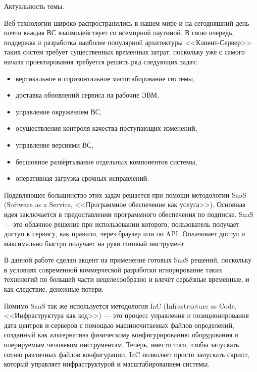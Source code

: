 \newpage

Актуальность темы.

Веб технологии широко распространились в нашем мире и на сегодняшний день почти каждая ВС взаимодействует со всемирной паутиной.
В свою очередь, поддержка и разработка наиболее популярной архитектуры <<Клиент-Сервер>> таких систем требует существенных временных затрат, поскольку уже с самого начала проектирования требуется решить ряд следующих задач:

\begin{itemize}
    \item вертикальное и горизонтальное масштабирование системы,
    \item доставка обновлений сервиса на рабочие ЭВМ,
    \item управление окружением ВС,
    \item осуществления контроля качества поступающих изменений,
    \item управление версиями ВС,
    \item бесшовное развёртывание отдельных компонентов системы,
    \item оперативная загрузка срочных исправлений.
\end{itemize}

Подавляющее большинство этих задач решается при помощи методологии SaaS (Software as a Service, <<Программное обеспечение как услуга>>).
Основная идея заключается в предоставлении программного обеспечения по подписке.
SaaS --- это облачное решение при использовании которого, пользователь получает доступ к сервису, как правило, через браузер или по API.
Оплачивает доступ и максимально быстро получает на руки готовый инструмент.

В данной работе сделан акцент на применение готовых SaaS решений, поскольку в условиях современной коммерческой разработки игнорирование таких
технологий по большей части нецелесообразно и влечёт серьёзные временные, и как следствие, денежные потери.

Помимо SaaS так же используется методология IaC (Infrastructure as Code, <<Инфраструктура как код>>) --- это процесс управления и позиционирования дата центров и серверов с помощью машиночитаемых файлов определений,
созданный как альтернатива физическому конфигурированию оборудования и оперируемым человеком инструментам.
Теперь, вместо того, чтобы запускать сотню различных файлов конфигурации,
IaC позволяет просто запускать скрипт, который управляет инфраструктурой и масштабированием системы.

